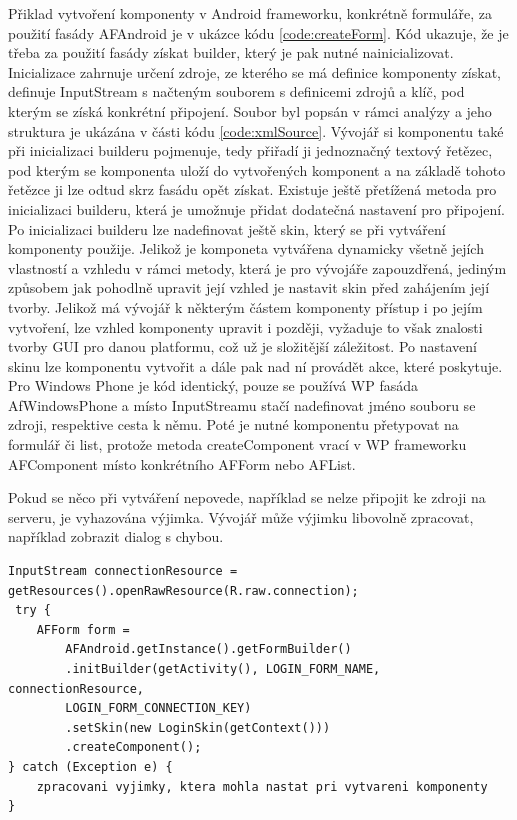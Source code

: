 Přiklad vytvoření komponenty v Android frameworku, konkrétně formuláře, za použití fasády AFAndroid je v ukázce kódu \ref{code:createForm}. Kód ukazuje, že je třeba za použití fasády získat builder, který je pak nutné nainicializovat. Inicializace zahrnuje určení zdroje, ze kterého se má definice komponenty získat, definuje InputStream s načteným souborem s definicemi zdrojů a klíč, pod kterým se získá konkrétní připojení. Soubor byl popsán v rámci analýzy a jeho struktura je ukázána v části kódu \ref{code:xmlSource}. Vývojář si komponentu také při inicializaci builderu pojmenuje, tedy přiřadí ji jednoznačný textový řetězec, pod kterým se komponenta uloží do vytvořených komponent a na základě tohoto řetězce ji lze odtud skrz fasádu opět získat. Existuje ještě přetížená metoda pro inicializaci builderu, která je umožnuje přidat dodatečná nastavení pro připojení. Po inicializaci builderu lze nadefinovat ještě skin, který se při vytváření komponenty použije. Jelikož je komponeta vytvářena dynamicky všetně jejích vlastností a vzhledu v rámci metody, která je pro vývojáře zapouzdřená, jediným způsobem jak pohodlně upravit její vzhled je nastavit skin před zahájením její tvorby. Jelikož má vývojář k některým částem komponenty přístup i po jejím vytvoření, lze vzhled komponenty upravit i později, vyžaduje to však znalosti tvorby GUI pro danou platformu, což už je složitější záležitost. Po nastavení skinu lze komponentu vytvořit a dále pak nad ní provádět akce, které poskytuje.  Pro Windows Phone je kód identický, pouze se používá WP fasáda AfWindowsPhone a místo InputStreamu stačí nadefinovat jméno souboru se zdroji, respektive cesta k němu. Poté je nutné komponentu přetypovat na formulář či list, protože metoda createComponent vrací v WP frameworku AFComponent místo konkrétního AFForm nebo AFList.

Pokud se něco při vytváření nepovede,  například se nelze připojit ke zdroji na serveru, je vyhazována výjimka. Vývojář může výjimku libovolně zpracovat, například zobrazit dialog s chybou.

\begin{lstlisting}[caption=Ukázka tvorby formuláře,
label={code:createForm}, basicstyle=\footnotesize]
InputStream connectionResource = getResources().openRawResource(R.raw.connection);
 try {
	AFForm form = 
		AFAndroid.getInstance().getFormBuilder()
		.initBuilder(getActivity(), LOGIN_FORM_NAME, connectionResource, 
		LOGIN_FORM_CONNECTION_KEY)
		.setSkin(new LoginSkin(getContext()))
		.createComponent();
} catch (Exception e) {
	zpracovani vyjimky, ktera mohla nastat pri vytvareni komponenty
}
\end{lstlisting} 


